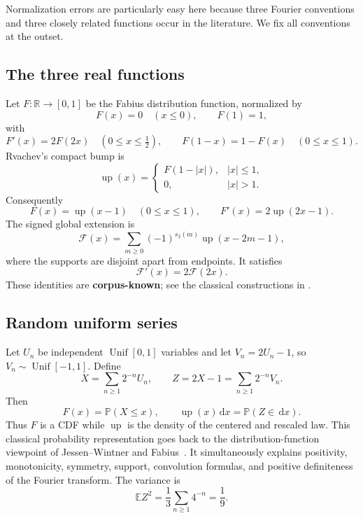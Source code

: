 \documentclass[11pt,oneside]{article}
\theoremstyle{definition}
\newcommand{\dd}{\,\mathrm d}
\newcommand{\E}{\mathbb E}
\newcommand{\Pp}{\mathbb P}
\newcommand{\R}{\mathbb R}
\newcommand{\Up}{\operatorname{up}}
\newcommand{\wt}{s_2}
\newcommand{\CorpusKnown}{\textcolor{linkblue}{\textbf{corpus-known}}}
\begin{document}
Normalization errors are particularly easy here because three Fourier conventions and
three closely related functions occur in the literature.  We fix all conventions at
the outset.

\subsection{The three real functions}

Let \(F\colon\R\to[0,1]\) be the Fabius distribution function, normalized by
\[
 F(x)=0\quad(x\le0),\qquad F(1)=1,
\]
with
\begin{equation}
 F'(x)=2F(2x)\quad(0\le x\le\tfrac12),
 \qquad F(1-x)=1-F(x)\quad(0\le x\le1).
 \label{p1:eq:F-basic}
\end{equation}
Rvachev's compact bump is
\begin{equation}
 \Up(x)=
 \begin{cases}
 F(1-|x|),& |x|\le1,\\
 0,& |x|>1.
 \end{cases}
 \label{p1:eq:up-fold}
\end{equation}
Consequently
\begin{equation}
 F(x)=\Up(x-1)\quad(0\le x\le1),
 \qquad
 F'(x)=2\Up(2x-1).
 \label{p1:eq:F-up}
\end{equation}
The signed global extension is
\begin{equation}
 \mathcal F(x)=\sum_{m\ge0}(-1)^{\wt(m)}\Up(x-2m-1),
 \label{p1:eq:signed-extension}
\end{equation}
where the supports are disjoint apart from endpoints.  It satisfies
\begin{equation}
 \mathcal F'(x)=2\mathcal F(2x).
 \label{p1:eq:global-selfdiff}
\end{equation}
These identities are \CorpusKnown{}; see the classical constructions in
\cite{p1:Fabius1966,p1:Arias1982,p1:Rvachev1990}.

\subsection{Random uniform series}

Let \(U_n\) be independent \(\operatorname{Unif}[0,1]\) variables and let
\(V_n=2U_n-1\), so \(V_n\sim\operatorname{Unif}[-1,1]\).  Define
\begin{equation}
 X=\sum_{n\ge1}2^{-n}U_n,
 \qquad
 Z=2X-1=\sum_{n\ge1}2^{-n}V_n.
 \label{p1:eq:random-series}
\end{equation}
Then
\begin{equation}
 F(x)=\Pp(X\le x),\qquad \Up(x)\dd x=\Pp(Z\in\dd x).
 \label{p1:eq:cdf-density}
\end{equation}
Thus \(F\) is a CDF while \(\Up\) is the density of the centered and rescaled law.
This classical probability representation goes back to the distribution-function viewpoint of
Jessen--Wintner and Fabius~\cite{p1:JessenWintner1935,p1:Fabius1966}.  It simultaneously explains positivity, monotonicity, symmetry,
support, convolution formulas, and positive definiteness of the Fourier transform.
The variance is
\begin{equation}
 \E Z^2=\frac13\sum_{n\ge1}4^{-n}=\frac19.
 \label{p1:eq:variance}
\end{equation}
\end{document}
